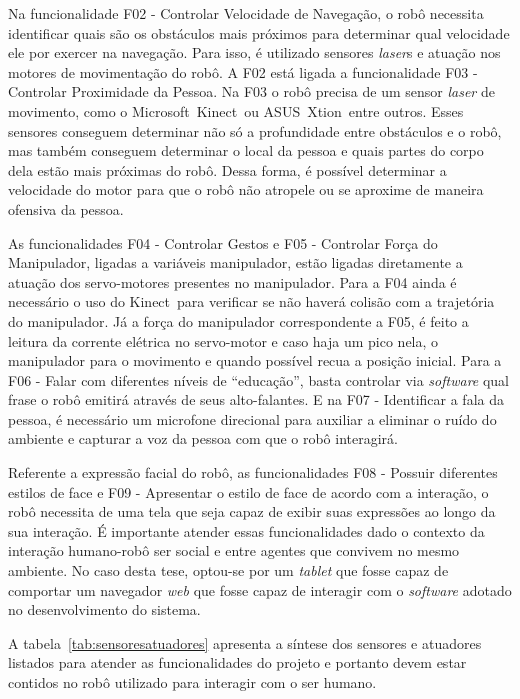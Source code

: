 Na funcionalidade F02 - Controlar Velocidade de Navegação, o robô necessita identificar quais são os obstáculos mais próximos para determinar qual velocidade ele por exercer na navegação. Para isso, é utilizado sensores \emph{laser}s e atuação nos motores de movimentação do robô. A F02 está ligada a funcionalidade F03 - Controlar Proximidade da Pessoa. Na F03 o robô precisa de um sensor \emph{laser} de movimento, como o Microsoft\textregistered\ Kinect\textregistered\ ou ASUS\textregistered\ Xtion\textregistered\, entre outros. Esses sensores conseguem determinar não só a profundidade entre obstáculos e o robô, mas também conseguem determinar o local da pessoa e quais partes do corpo dela estão mais próximas do robô. Dessa forma, é possível determinar a velocidade do motor para que o robô não atropele ou se aproxime de maneira ofensiva da pessoa.

As funcionalidades F04 - Controlar Gestos e F05 - Controlar Força do Manipulador, ligadas a variáveis manipulador, estão ligadas diretamente a atuação dos servo-motores presentes no manipulador. Para a F04 ainda é necessário o uso do Kinect\textregistered\ para verificar se não haverá colisão com a trajetória do manipulador. Já a força do manipulador correspondente a F05, é feito a leitura da corrente elétrica no servo-motor e caso haja um pico nela, o manipulador para o movimento e quando possível recua a posição inicial. Para a F06 - Falar com diferentes níveis de ``educação'', basta controlar via \emph{software} qual frase o robô emitirá através de seus alto-falantes. E na F07 - Identificar a fala da pessoa, é necessário um microfone direcional para auxiliar a eliminar o ruído do ambiente e capturar a voz da pessoa com que o robô interagirá.

Referente a expressão facial do robô, as funcionalidades F08 - Possuir diferentes estilos de face e F09 -
Apresentar o estilo de face de acordo com a interação, o robô necessita de uma tela que seja capaz de exibir suas expressões ao longo da sua interação. É importante atender essas funcionalidades dado o contexto da interação humano-robô ser social e entre agentes que convivem no mesmo ambiente. No caso desta tese, optou-se por um \emph{tablet} que fosse capaz de comportar um navegador \emph{web} que fosse capaz de interagir com o \emph{software} adotado no desenvolvimento do sistema.

A tabela~\ref{tab:sensoresatuadores} apresenta a síntese dos sensores e atuadores listados para atender as funcionalidades do projeto e portanto devem estar contidos no robô utilizado para interagir com o ser humano.

